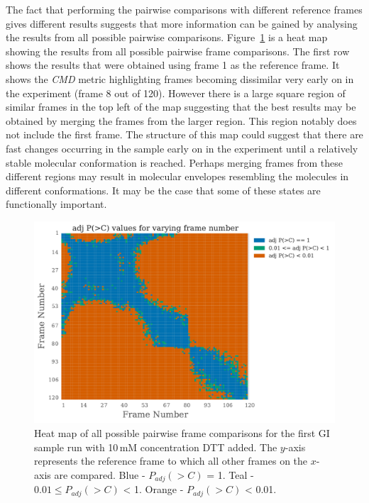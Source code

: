 The fact that performing the pairwise comparisons with different reference frames gives different results suggests that more information can be gained by analysing the results from all possible pairwise comparisons.
Figure~\ref{fig:heatmap - DTT} is a heat map showing the results from all possible pairwise frame comparisons.
The first row shows the results that were obtained using frame 1 as the reference frame.
It shows the \textit{CMD} metric highlighting frames becoming dissimilar very early on in the experiment (frame 8 out of 120).
However there is a large square region of similar frames in the top left of the map suggesting that the best results may be obtained by merging the frames from the larger region.
This region notably does not include the first frame.
The structure of this map could suggest that there are fast changes occurring in the sample early on in the experiment until a relatively stable molecular conformation is reached.
Perhaps merging frames from these different regions may result in molecular envelopes resembling the molecules in different conformations.
It may be the case that some of these states are functionally important.
\begin{figure}
    \centering
    \includegraphics[width=1.0\textwidth]{figures/saxs/dtt_heatmap.pdf}
    \caption{Heat map of all possible pairwise frame comparisons for the first GI sample run with 10\,mM concentration DTT added. The $y$-axis represents the reference frame to which all other frames on the $x$-axis are compared. Blue - $P_{adj}(>C)$ = 1. Teal - $0.01 \le P_{adj}(>C)$ < 1. Orange - $P_{adj}(>C)$ < 0.01.}
    \label{fig:heatmap - DTT}
\end{figure}

